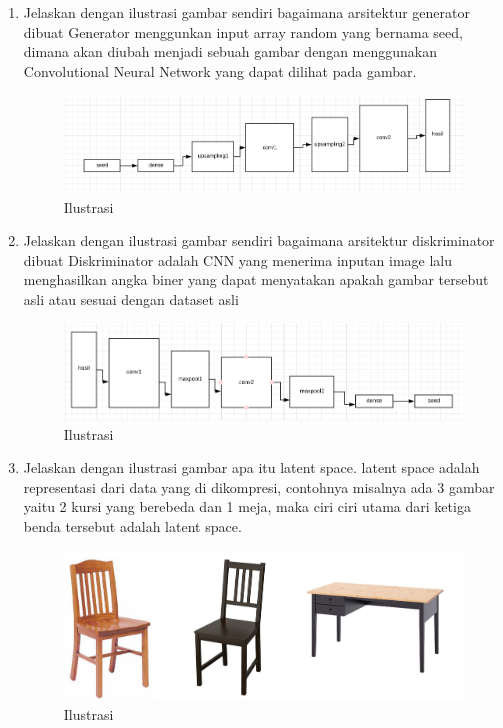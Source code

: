 \begin{enumerate}
\item Jelaskan dengan ilustrasi gambar sendiri bagaimana arsitektur generator dibuat
Generator menggunkan input array random yang bernama seed, dimana akan diubah menjadi sebuah gambar dengan menggunakan Convolutional Neural Network yang dapat dilihat pada gambar.
\begin{figure}[ht]
\centering
\includegraphics[scale=0.3]{figures/1174002/chapter8/3.PNG}
\caption{Ilustrasi}
\label{Contoh}
\end{figure}


\item Jelaskan dengan ilustrasi gambar sendiri bagaimana arsitektur diskriminator dibuat
Diskriminator adalah CNN yang menerima inputan image lalu menghasilkan angka biner yang dapat menyatakan apakah gambar tersebut asli atau sesuai dengan dataset asli
\begin{figure}[ht]
\centering
\includegraphics[scale=0.3]{figures/1174002/chapter8/4.PNG}
\caption{Ilustrasi}
\label{Contoh}
\end{figure}


\item Jelaskan dengan ilustrasi gambar apa itu latent space.
latent space adalah representasi dari data yang di dikompresi, contohnya misalnya ada 3 gambar yaitu 2 kursi yang berebeda dan 1 meja, maka ciri ciri utama dari ketiga benda tersebut adalah latent space.
\begin{figure}[ht]
\centering
\includegraphics[scale=0.3]{figures/1174002/chapter8/5.PNG}
\caption{Ilustrasi}
\label{Contoh}
\end{figure}



\end{enumerate}
